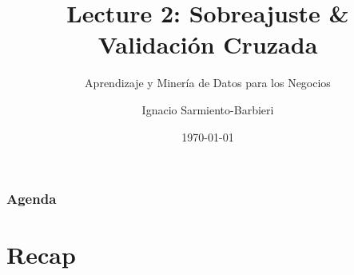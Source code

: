 \documentclass[
  shownotes,
  xcolor={svgnames},
  hyperref={colorlinks,citecolor=DarkBlue,linkcolor=DarkRed,urlcolor=DarkBlue}
  , aspectratio=169]{beamer}
\begin{document}
\title{Lecture 2:  Sobreajuste \&  Validación Cruzada}
\subtitle{Aprendizaje y Minería de Datos para los Negocios}
\date{\today}

\author[Sarmiento-Barbieri]{Ignacio Sarmiento-Barbieri}


\begin{frame}[noframenumbering]
\maketitle
\end{frame}





\begin{frame}
\frametitle{Agenda}

\tableofcontents


\end{frame}
\section{Recap} 
\end{document}
